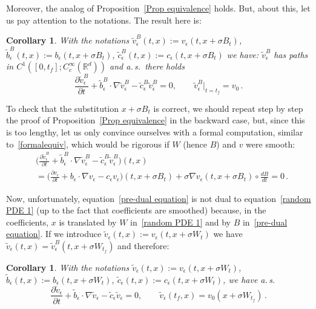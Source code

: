 \documentclass[a4paper,10pt]{article}
\newtheorem{corollary}[theorem]{Corollary}
\begin{document}
Moreover, the analog of Proposition~\ref{Prop equivalence} holds. But, about
this, let us pay attention to the notations. The result here is:

\begin{corollary}
With the notations $\widetilde{v}_{\epsilon}^{B}(t,x) :=v_{\epsilon}(t,x+\sigma B_{t})$, $\widetilde{b}_{\epsilon}^{B}(t,x) :=b_{\epsilon}(t,x+\sigma B_{t})$, $\widetilde{c}_{\epsilon}^{B}(t,x) :=c_{\epsilon}(t,x+\sigma B_{t})$ we have:
$\widetilde{v}_{\epsilon}^{B}$ has paths in $C^{1}([0,t_{f}];C_{c}^{\infty}(  \mathbb{R}^{d}))$ and a.\,s.\ there holds
\begin{equation}
\frac{\partial\widetilde{v}_{\epsilon}^{B}}{\partial t}+\widetilde{b} 
_{\epsilon}^{B}\cdot\nabla\widetilde{v}_{\epsilon}^{B}-\widetilde{c} 
_{\epsilon}^{B}\widetilde{v}_{\epsilon}^{B}=0,\qquad\widetilde{v}_{\epsilon
}^{B}|_{t=t_{f}}=v_{0} \,. \label{pre-dual equation}
\end{equation}
\end{corollary}

To check that the substitution $x+\sigma B_{t}$ is correct, we should repeat
step by step the proof of Proposition~\ref{Prop equivalence} in the backward
case, but, since this is too lengthy, let us only convince ourselves with a
formal computation, similar to~\eqref{formalequiv}, which would be rigorous if $W$ (hence $B$) and $v$ were smooth:
\begin{align*}
&  \Big( \frac{\partial\widetilde{v}_{\epsilon}^{B}}{\partial t}
+\widetilde{b}_{\epsilon}^{B}\cdot\nabla\widetilde{v}_{\epsilon}
^{B}-\widetilde{c}_{\epsilon}^{B}\widetilde{v}_{\epsilon}^{B}\Big) (t,x) \\
&  = \Big( \frac{\partial v_{\epsilon}}{\partial t}+b_{\epsilon}\cdot\nabla
v_{\epsilon}-c_{\epsilon}v_{\epsilon}\Big) (t,x+\sigma B_{t})
+\sigma\nabla v_{\epsilon}(t,x+\sigma B_{t}) \circ \frac{dB}{dt}=0 \,.
\end{align*}

Now, unfortunately, equation~\eqref{pre-dual equation} is not dual to equation~\eqref{random PDE 1} (up to the fact that coefficients are smoothed) because,
in the coefficients, $x$ is translated by $W$ in~\eqref{random PDE 1} and by
$B$ in~\eqref{pre-dual equation}. If we introduce $\widetilde{v}_{\epsilon
}(t,x)  :=v_{\epsilon}(t,x+\sigma W_{t}) $ we have
$\widetilde{v}_{\epsilon}(t,x)  =\widetilde{v}_{\epsilon}
^{B}(t,x+\sigma W_{t_{f}})$ and therefore:

\begin{corollary}\label{SPDE PDE backward}
With the notations $\widetilde{v}_{\epsilon}( t,x):=v_{\epsilon}(
t,x+\sigma W_{t})$, $\widetilde{b}_{\epsilon}(t,x):=b_{\epsilon}(t,x+\sigma W_{t})$, $\widetilde{c}_{\epsilon}(t,x):=c_{\epsilon}(t,x+\sigma W_{t})$, we have a.\,s.
\begin{equation}
\frac{\partial\widetilde{v}_{\epsilon}}{\partial t}+\widetilde{b}_{\epsilon
}\cdot\nabla\widetilde{v}_{\epsilon}-\widetilde{c}_{\epsilon}\widetilde{v}
_{\epsilon}=0,\qquad\widetilde{v}_{\epsilon} (t_{f},x)
=v_{0}(x+\sigma W_{t_{f}}) \, . \label{dual equation}
\end{equation}
\end{corollary}
\end{document}
